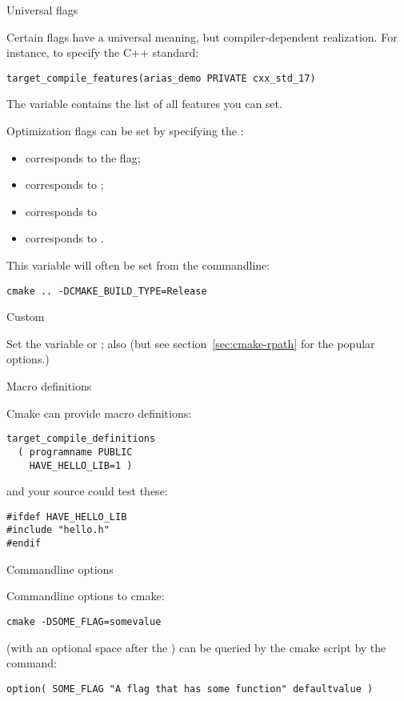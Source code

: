  {Universal flags}

Certain flags have a universal meaning, but compiler-dependent realization.
For instance, to specify the C++ standard:
\begin{lstlisting}
target_compile_features(arias_demo PRIVATE cxx_std_17)
\end{lstlisting}
The variable 
contains the list of all features you can set.

Optimization flags can be set by specifying the :
\begin{itemize}
\item 
     corresponds to the  flag;
\item
     corresponds to ;
\item
     corresponds to 
\item 
     corresponds to .
\end{itemize}
This variable will often be set from the commandline:
\begin{verbatim}
cmake .. -DCMAKE_BUILD_TYPE=Release
\end{verbatim}

 {Custom}

Set the variable
or
;
also
(but see section~\ref{sec:cmake-rpath}
for the popular  options.)

 {Macro definitions}

Cmake can provide macro definitions:
\begin{lstlisting}
target_compile_definitions
  ( programname PUBLIC
    HAVE_HELLO_LIB=1 )
\end{lstlisting}
and your source could test these:
\lstset{language=C}
\begin{lstlisting}
#ifdef HAVE_HELLO_LIB
#include "hello.h"
#endif
\end{lstlisting}
\lstset{language=CMake}

 {Commandline options}
\label{sec:cmake-doption}

Commandline options to cmake:
\begin{verbatim}
cmake -DSOME_FLAG=somevalue
\end{verbatim}
(with an optional space after the )
can be queried by the cmake script by the  command:
\begin{lstlisting}
option( SOME_FLAG "A flag that has some function" defaultvalue )
\end{lstlisting}

